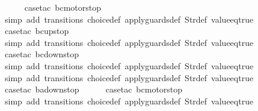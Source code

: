 \begin{isabellebody}
\ \ \ \ \isamarkupfalse%
\ {\isacharparenleft}case{\isacharunderscore}tac\ {\isachardoublequoteopen}bc{\isacharequal}motorstop{}{\isachardoublequoteclose}{\isacharparenright}\isanewline
\ \ \ \ \ \isamarkupfalse%
\ {\isacharparenleft}simp\ add{\isacharcolon}\ transitions\ choice{\isacharunderscore}def\ apply{\isacharunderscore}guards{\isacharunderscore}def\ Str{\isacharunderscore}def\ value{\isacharunderscore}eq{\isacharunderscore}true{\isacharparenright}\isanewline
\ \ \ \ \isamarkupfalse%
\ {\isacharparenleft}case{\isacharunderscore}tac\ {\isachardoublequoteopen}bc{\isacharequal}up{}{}stop{\isachardoublequoteclose}{\isacharparenright}\isanewline
\ \ \ \ \ \isamarkupfalse%
\ {\isacharparenleft}simp\ add{\isacharcolon}\ transitions\ choice{\isacharunderscore}def\ apply{\isacharunderscore}guards{\isacharunderscore}def\ Str{\isacharunderscore}def\ value{\isacharunderscore}eq{\isacharunderscore}true{\isacharparenright}\isanewline
\ \ \ \ \isamarkupfalse%
\ {\isacharparenleft}case{\isacharunderscore}tac\ {\isachardoublequoteopen}bc{\isacharequal}down{}{}stop{\isachardoublequoteclose}{\isacharparenright}\isanewline
\ \ \ \ \ \isamarkupfalse%
\ {\isacharparenleft}simp\ add{\isacharcolon}\ transitions\ choice{\isacharunderscore}def\ apply{\isacharunderscore}guards{\isacharunderscore}def\ Str{\isacharunderscore}def\ value{\isacharunderscore}eq{\isacharunderscore}true{\isacharparenright}\isanewline
\ \ \isamarkupfalse%
\ {\isacharparenleft}simp\ add{\isacharcolon}\ transitions\ choice{\isacharunderscore}def\ apply{\isacharunderscore}guards{\isacharunderscore}def\ Str{\isacharunderscore}def\ value{\isacharunderscore}eq{\isacharunderscore}true{\isacharparenright}\isanewline
\ \isamarkupfalse%
\ {\isacharparenleft}case{\isacharunderscore}tac\ {\isachardoublequoteopen}ba{\isacharequal}down{}{}stop{\isachardoublequoteclose}{\isacharparenright}\isanewline
\ \ \ \ \isamarkupfalse%
\ {\isacharparenleft}case{\isacharunderscore}tac\ {\isachardoublequoteopen}bc{\isacharequal}motorstop{}{\isachardoublequoteclose}{\isacharparenright}\isanewline
\ \ \ \ \ \isamarkupfalse%
\ {\isacharparenleft}simp\ add{\isacharcolon}\ transitions\ choice{\isacharunderscore}def\ apply{\isacharunderscore}guards{\isacharunderscore}def\ Str{\isacharunderscore}def\ value{\isacharunderscore}eq{\isacharunderscore}true{\isacharparenright}\isanewline

\end{isabellebody}
